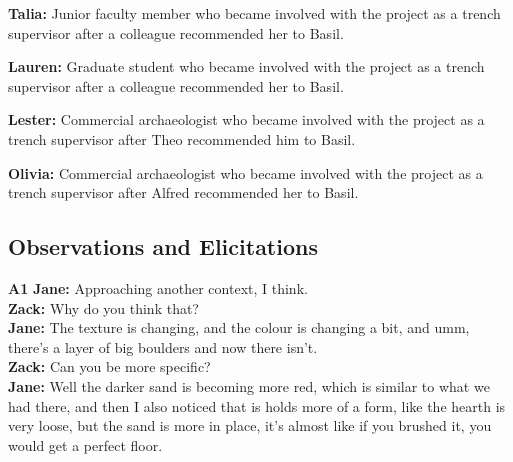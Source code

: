 \documentclass{article}
\begin{document}
\noindent\textbf{Talia:} Junior faculty member who became involved with the
project as a trench supervisor after a colleague recommended her to
Basil.\newline

\noindent\textbf{Lauren:} Graduate student who became involved with the project
as a trench supervisor after a colleague recommended her to Basil.\newline

\noindent\textbf{Lester:} Commercial archaeologist who became involved with the
project as a trench supervisor after Theo recommended him to Basil.\newline

\noindent\textbf{Olivia:} Commercial archaeologist who became involved with the
project as a trench supervisor after Alfred recommended her to Basil.\newline

\subsection{Observations and Elicitations}\label{observations-and-elicitations}

\textbf{A1}\label{sec-A1}\newline
\textbf{Jane:} Approaching another context, I think.\\
\textbf{Zack:} Why do you think that?\\
\textbf{Jane:} The texture is changing, and the colour is changing a
bit, and umm, there's a layer of big boulders and now there isn't.\\
\textbf{Zack:} Can you be more specific?\\
\textbf{Jane:} Well the darker sand is becoming more red, which is
similar to what we had there, and then I also noticed that is holds more
of a form, like the hearth is very loose, but the sand is more in place,
it's almost like if you brushed it, you would get a perfect floor.\newline
\end{document}
